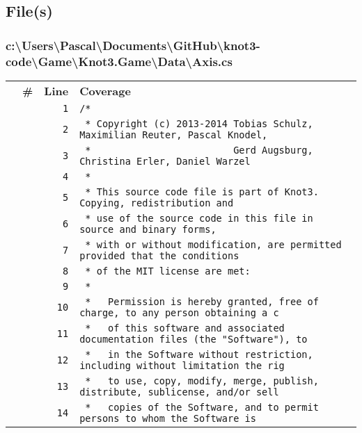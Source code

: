 \documentclass[a4paper,10pt]{article}
\begin{document}
\subsection{File(s)}
\subsubsection{c:\textbackslash Users\textbackslash Pascal\textbackslash Documents\textbackslash GitHub\textbackslash knot3-code\textbackslash Game\textbackslash Knot3.Game\textbackslash Data\textbackslash Axis.cs}
\begin{longtable}[l]{lrrl}
\textbf{} & \textbf{\#} & \textbf{Line} & \textbf{Coverage}\\
\cellcolor{gray} &  & \verb~1~ & \verb~/*~\\
\cellcolor{gray} &  & \verb~2~ & \verb~ * Copyright (c) 2013-2014 Tobias Schulz, Maximilian Reuter, Pascal Knodel,~\\
\cellcolor{gray} &  & \verb~3~ & \verb~ *                         Gerd Augsburg, Christina Erler, Daniel Warzel~\\
\cellcolor{gray} &  & \verb~4~ & \verb~ *~\\
\cellcolor{gray} &  & \verb~5~ & \verb~ * This source code file is part of Knot3. Copying, redistribution and~\\
\cellcolor{gray} &  & \verb~6~ & \verb~ * use of the source code in this file in source and binary forms,~\\
\cellcolor{gray} &  & \verb~7~ & \verb~ * with or without modification, are permitted provided that the conditions~\\
\cellcolor{gray} &  & \verb~8~ & \verb~ * of the MIT license are met:~\\
\cellcolor{gray} &  & \verb~9~ & \verb~ *~\\
\cellcolor{gray} &  & \verb~10~ & \verb~ *   Permission is hereby granted, free of charge, to any person obtaining a c~\\
\cellcolor{gray} &  & \verb~11~ & \verb~ *   of this software and associated documentation files (the "Software"), to ~\\
\cellcolor{gray} &  & \verb~12~ & \verb~ *   in the Software without restriction, including without limitation the rig~\\
\cellcolor{gray} &  & \verb~13~ & \verb~ *   to use, copy, modify, merge, publish, distribute, sublicense, and/or sell~\\
\cellcolor{gray} &  & \verb~14~ & \verb~ *   copies of the Software, and to permit persons to whom the Software is~\\

\end{longtable}
\end{document}
